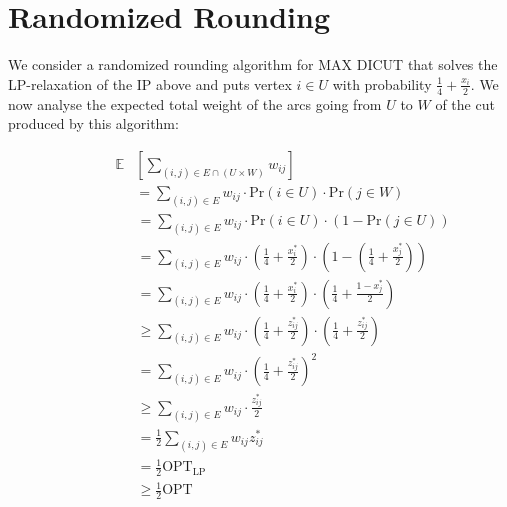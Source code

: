 \documentclass{article}
\begin{document}
\section{Randomized Rounding}

We consider a randomized rounding algorithm for MAX DICUT that solves the LP-relaxation of the IP above and puts vertex $i \in U$ with probability $\frac{1}{4} + \frac{x_i}{2}$. We now analyse the expected total weight of the arcs going from $U$ to $W$ of the cut produced by this algorithm:

\begin{align}
    \mathbb{E}&\left[\sum_{(i,j) \in E \cap (U \times W)} w_{ij}\right]\label{eq3:1}\\
     &=\sum_{(i,j) \in E} w_{ij} \cdot \text{Pr}(i \in U) \cdot \text{Pr}(j \in W)\label{eq3:2}
\end{align}
\begin{align}
    \quad\quad\quad\quad&=\sum_{(i,j) \in E} w_{ij} \cdot \text{Pr}(i \in U) \cdot (1 - \text{Pr}(j \in U))\label{eq3:3}\\
    &=\sum_{(i,j) \in E} w_{ij} \cdot \left(\frac{1}{4} + \frac{x_i^*}{2}\right) \cdot \left(1 - \left(\frac{1}{4} + \frac{x_j^*}{2}\right)\right)\label{eq3:4}\\
    &=\sum_{(i,j) \in E} w_{ij} \cdot \left(\frac{1}{4} + \frac{x_i^*}{2}\right) \cdot \left(\frac{1}{4} + \frac{1 - x_j^*}{2}\right)\label{eq3:5}\\
    &\ge\sum_{(i,j) \in E} w_{ij} \cdot \left(\frac{1}{4} + \frac{z_{ij}^*}{2}\right) \cdot \left(\frac{1}{4} + \frac{z_{ij}^*}{2}\right)\label{eq3:6}\\
    &=\sum_{(i,j) \in E} w_{ij} \cdot \left(\frac{1}{4} + \frac{z_{ij}^*}{2}\right)^2\label{eq3:7}\\
    &\ge\sum_{(i,j) \in E} w_{ij} \cdot \frac{z_{ij}^*}{2}\label{eq3:8}\\
    &=\frac{1}{2} \sum_{(i,j) \in E} w_{ij} z_{ij}^*\label{eq3:9}\\
    &=\frac{1}{2} \text{OPT}_\text{LP}\label{eq3:10}\\
    &\ge \frac{1}{2} \text{OPT}\label{eq3:11}
\end{align}
\end{document}
